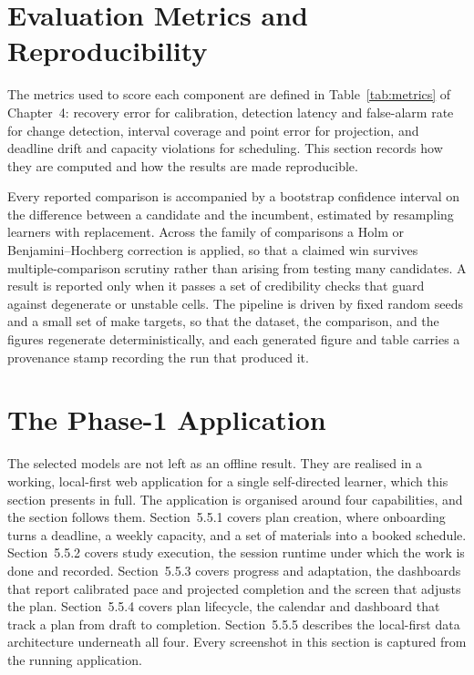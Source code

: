 \section{Evaluation Metrics and Reproducibility}
The metrics used to score each component are defined in Table~\ref{tab:metrics} of Chapter~4: recovery error for calibration, detection latency and false-alarm rate for change detection, interval coverage and point error for projection, and deadline drift and capacity violations for scheduling. This section records how they are computed and how the results are made reproducible.

Every reported comparison is accompanied by a bootstrap confidence interval on the difference between a candidate and the incumbent, estimated by resampling learners with replacement. Across the family of comparisons a Holm or Benjamini--Hochberg correction is applied, so that a claimed win survives multiple-comparison scrutiny rather than arising from testing many candidates. A result is reported only when it passes a set of credibility checks that guard against degenerate or unstable cells. The pipeline is driven by fixed random seeds and a small set of make targets, so that the dataset, the comparison, and the figures regenerate deterministically, and each generated figure and table carries a provenance stamp recording the run that produced it.

\section{The Phase-1 Application}
The selected models are not left as an offline result. They are realised in a working, local-first web application for a single self-directed learner, which this section presents in full. The application is organised around four capabilities, and the section follows them. Section~5.5.1 covers plan creation, where onboarding turns a deadline, a weekly capacity, and a set of materials into a booked schedule. Section~5.5.2 covers study execution, the session runtime under which the work is done and recorded. Section~5.5.3 covers progress and adaptation, the dashboards that report calibrated pace and projected completion and the screen that adjusts the plan. Section~5.5.4 covers plan lifecycle, the calendar and dashboard that track a plan from draft to completion. Section~5.5.5 describes the local-first data architecture underneath all four. Every screenshot in this section is captured from the running application.

